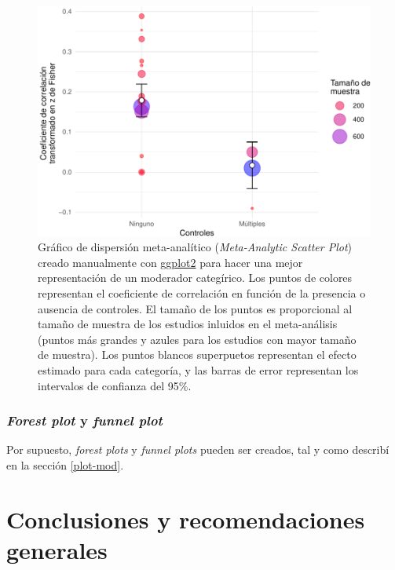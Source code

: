 \documentclass[
  bookmarksnumbered]{article}
\begin{document}
\begin{figure}
\centering
\includegraphics{Meta-analysis_files/figure-latex/reg-plot3-1.pdf}
\caption{\label{fig:reg-plot3}Gráfico de dispersión meta-analítico (\emph{Meta-Analytic Scatter Plot}) creado manualmente con \href{https://ggplot2.tidyverse.org/}{ggplot2} para hacer una mejor representación de un moderador categírico. Los puntos de colores representan el coeficiente de correlación en función de la presencia o ausencia de controles. El tamaño de los puntos es proporcional al tamaño de muestra de los estudios inluidos en el meta-análisis (puntos más grandes y azules para los estudios con mayor tamaño de muestra). Los puntos blancos superpuetos representan el efecto estimado para cada categoría, y las barras de error representan los intervalos de confianza del 95\%.}
\end{figure}

\hypertarget{plot-mod2}{%
\subsubsection{\texorpdfstring{\emph{Forest plot} y \emph{funnel plot}}{Forest plot y funnel plot}}\label{plot-mod2}}

Por supuesto, \emph{forest plots} y \emph{funnel plots} pueden ser creados, tal y como describí en la sección \ref{plot-mod}.

\hypertarget{conclusiones-y-recomendaciones-generales}{%
\section{Conclusiones y recomendaciones generales}\label{conclusiones-y-recomendaciones-generales}}
\end{document}
